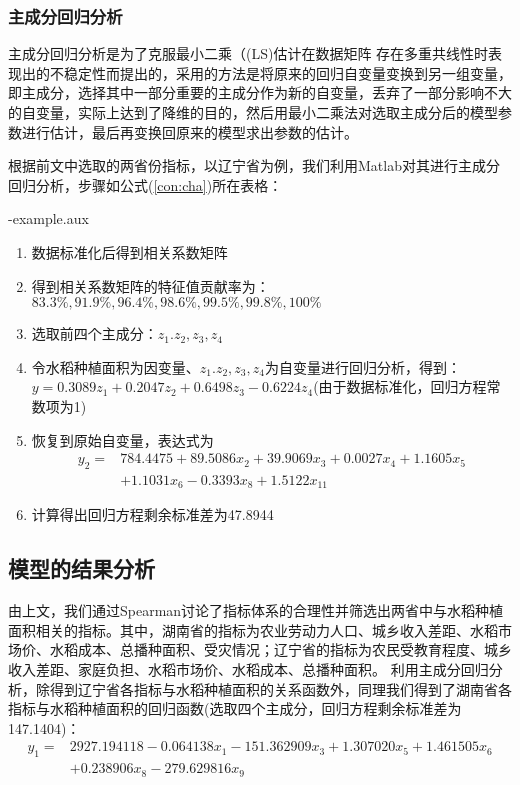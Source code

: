 \documentclass[withoutpreface,bwprint]{cumcmthesis} %
\makeatletter
\newlength\savefboxrule
\newlength\savefboxsep
\edef\example@name{\jobname-example.aux}
\newenvironment{hexample}%
{%
\renewcommand{\minted@FVB@VerbatimOut}[1]{%
  \@bsphack
  \begingroup
    \FV@DefineWhiteSpace
    \def\FV@Space{\space}%
    \FV@DefineTabOut
    \let\FV@ProcessLine\minted@write@detok
    \immediate\openout\FV@OutFile ##1\relax
    \let\FV@FontScanPrep\relax
    \let\@noligs\relax
    \FV@Scan}
\minted@FVB@VerbatimOut{\example@name}}%
{\minted@FVE@VerbatimOut%
  \trivlist\item\relax
  \setlength{\savefboxrule}{\fboxrule}%
  \setlength{\savefboxsep}{\fboxsep}%
  \setlength{\fboxsep}{0.015\textwidth}%
  \setlength{\fboxrule}{0.4pt}%
  \fcolorbox[gray]{0}{0.95}{%
    \begin{minipage}[c]{1\textwidth}%
          \setlength{\fboxrule}{\savefboxrule}%
          \setlength{\fboxsep}{\savefboxsep}%
          \setlength{\parskip}{1ex plus 0.4ex minus 0.2ex}%
          \normalsize%
        \end{minipage}%
  }%
  \hfill%
  \endtrivlist
}
\makeatother
\begin{document}
\subsubsection{主成分回归分析}
主成分回归分析是为了克服最小二乘（(LS)估计在数据矩阵 存在多重共线性时表现出的不稳定性而提出的，采用的方法是将原来的回归自变量变换到另一组变量，即主成分，选择其中一部分重要的主成分作为新的自变量，丢弃了一部分影响不大的自变量，实际上达到了降维的目的，然后用最小二乘法对选取主成分后的模型参数进行估计，最后再变换回原来的模型求出参数的估计。\par
根据前文中选取的两省份指标，以辽宁省为例，我们利用Matlab对其进行主成分回归分析，步骤如公式(\ref{con:cha})所在表格：\par
\begin{hexample}
\begin{enumerate}
\item 数据标准化后得到相关系数矩阵
\item 得到相关系数矩阵的特征值贡献率为：$83.3\%,91.9\%,96.4\%,98.6\%,99.5\%,99.8\%,100\%$
\item 选取前四个主成分：$z_1.z_2,z_3,z_4$
\item 令水稻种植面积为因变量、$z_1.z_2,z_3,z_4$为自变量进行回归分析，得到：$y=0.3089z_1+0.2047z_2+0.6498z_3-0.6224z_4$(由于数据标准化，回归方程常数项为1)
\item 恢复到原始自变量，表达式为\\
\begin{equation}
\label{con:cha}
\begin{split}
y_2=&784.4475+89.5086x_2+39.9069x_3+0.0027x_4+1.1605x_5\\
&+1.1031x_6-0.3393x_8+1.5122x_{11}
\end{split}
\end{equation}
\item 计算得出回归方程剩余标准差为47.8944
\end{enumerate}
\end{hexample}
		
\subsection{模型的结果分析}
由上文，我们通过Spearman讨论了指标体系的合理性并筛选出两省中与水稻种植面积相关的指标。其中，湖南省的指标为农业劳动力人口、城乡收入差距、水稻市场价、水稻成本、总播种面积、受灾情况；辽宁省的指标为农民受教育程度、城乡收入差距、家庭负担、水稻市场价、水稻成本、总播种面积。
利用主成分回归分析，除得到辽宁省各指标与水稻种植面积的关系函数外，同理我们得到了湖南省各指标与水稻种植面积的回归函数(选取四个主成分，回归方程剩余标准差为147.1404)：
\begin{equation*}
\begin{split}
y_1=&2927.194118-0.064138x_1-151.362909x_3+1.307020x_5+1.461505x_6\\
&+0.238906x_8-279.629816x_9
\end{split}
\end{equation*}\par
\end{document}
